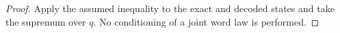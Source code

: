 \begin{proof}
Apply the assumed inequality to the exact and decoded states and take the
supremum over $q$. No conditioning of a joint word law is performed.
\end{proof}
